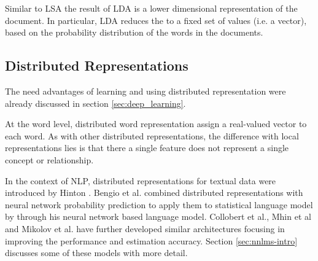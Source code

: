 Similar to \ac{LSA} the result of \ac{LDA} is a lower dimensional
representation of the document. In particular, LDA
reduces the  to a fixed set of values  (i.e. a vector),  based on the
probability distribution of the words in the documents.

 \subsection{Distributed Representations}
 \label{sec:dis_rep}
The need advantages of  learning and using  distributed representation were already discussed in section \ref{sec:deep_learning}.

At the word level, distributed word representation assign a real-valued vector
to each word. As with other distributed representations, the  difference with local representations lies  is that there a single 
feature does not represent a single concept or relationship.

In the context of \ac{NLP},  distributed representations for textual data were
introduced by Hinton \cite{hinton:learndistrep}. 
 Bengio et al. \cite{Bengio:2008} combined distributed representations with neural network probability prediction  to apply them  to
statistical language model by through his
neural network based language model. Collobert  et al.\cite{collobert:2008}, Mhin et
al \cite{Mnih08ascalable} and
Mikolov et al.  \cite{conf/interspeech/MikolovKBCK10,conf/icassp/MikolovKBGC09} have further developed similar architectures focusing in improving the performance and estimation accuracy. Section \ref{sec:nnlms-intro} discusses some of these models with more detail.










